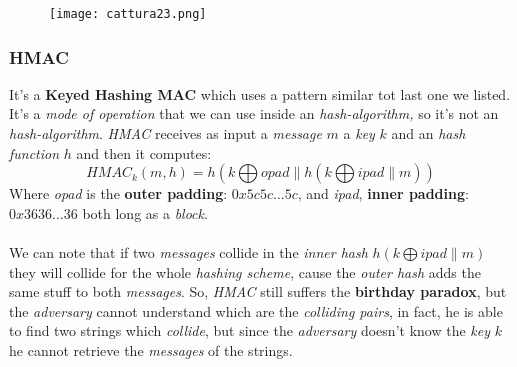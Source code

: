 \documentclass{article}
\begin{document}
\begin{itemize}
\begin{itemize}
\begin{figure}[H]
  \centering
  \texttt{[image: cattura23.png]}
\end{figure}
\end{itemize} 
\end{itemize}
\subsubsection{HMAC}
It's a \textbf{Keyed Hashing MAC} which uses a pattern similar tot last one we listed. It's a \emph{mode of operation} that we can use inside an \emph{hash-algorithm,} so it's not an \emph{hash-algorithm}. \emph{HMAC} receives as input a \emph{message} $m$ a \emph{key} $k$ and an \emph{hash function} $h$ and then it computes:
\[ HMAC_k(m,h) = h(k \bigoplus opad \parallel h (k \bigoplus ipad \parallel m))\]
Where \emph{opad} is the \textbf{outer padding}: $0x5c5c...5c$, and \emph{ipad}, \textbf{inner padding}: $0x3636...36$ both long as a \emph{block}. \\\\
We can note that if two \emph{messages} collide in the \emph{inner hash} $h(k \bigoplus ipad \parallel m)$ they will collide for the whole \emph{hashing scheme}, cause the \emph{outer hash} adds the same stuff to both \emph{messages}. So, \emph{HMAC} still suffers the \textbf{birthday paradox}, but the \emph{adversary} cannot understand which are the \emph{colliding pairs}, in fact, he is able to find two strings which \emph{collide}, but since the \emph{adversary} doesn't know the \emph{key} $k$ he cannot retrieve the \emph{messages} of the strings. 
\end{document}
